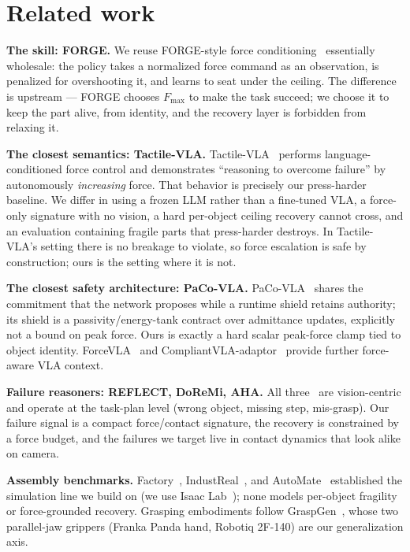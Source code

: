 \documentclass[11pt]{article}
\newcommand{\Fmax}{\ensuremath{F_{\max}}}
\begin{document}
\section{Related work}
\label{sec:related}

\textbf{The skill: FORGE.} We reuse FORGE-style force conditioning~\citep{noseworthy2025forge} essentially wholesale: the policy takes a normalized force command as an observation, is penalized for overshooting it, and learns to seat under the ceiling. The difference is upstream --- FORGE chooses \Fmax{} to make the task succeed; we choose it to keep the part alive, from identity, and the recovery layer is forbidden from relaxing it.

\textbf{The closest semantics: Tactile-VLA.} Tactile-VLA~\citep{huang2025tactilevla} performs language-conditioned force control and demonstrates ``reasoning to overcome failure'' by autonomously \emph{increasing} force. That behavior is precisely our press-harder baseline. We differ in using a frozen LLM rather than a fine-tuned VLA, a force-only signature with no vision, a hard per-object ceiling recovery cannot cross, and an evaluation containing fragile parts that press-harder destroys. In Tactile-VLA's setting there is no breakage to violate, so force escalation is safe by construction; ours is the setting where it is not.

\textbf{The closest safety architecture: PaCo-VLA.} PaCo-VLA~\citep{cao2026pacovla} shares the commitment that the network proposes while a runtime shield retains authority; its shield is a passivity/energy-tank contract over admittance updates, explicitly not a bound on peak force. Ours is exactly a hard scalar peak-force clamp tied to object identity. ForceVLA~\citep{yu2025forcevla} and CompliantVLA-adaptor~\citep{zhang2026compliantvla} provide further force-aware VLA context.

\textbf{Failure reasoners: REFLECT, DoReMi, AHA.} All three~\citep{liu2023reflect,guo2023doremi,duan2024aha} are vision-centric and operate at the task-plan level (wrong object, missing step, mis-grasp). Our failure signal is a compact force/contact signature, the recovery is constrained by a force budget, and the failures we target live in contact dynamics that look alike on camera.

\textbf{Assembly benchmarks.} Factory~\citep{narang2022factory}, IndustReal~\citep{tang2023industreal}, and AutoMate~\citep{tang2024automate} established the simulation line we build on (we use Isaac Lab~\citep{mittal2025isaaclab,mittal2023orbit}); none models per-object fragility or force-grounded recovery. Grasping embodiments follow GraspGen~\citep{murali2025graspgen}, whose two parallel-jaw grippers (Franka Panda hand, Robotiq 2F-140) are our generalization axis.
\end{document}
